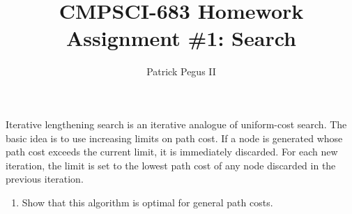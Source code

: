 \documentclass[12pt]{article}
\newenvironment{problem}[2][Problem]{\begin{trivlist}
\item[\hskip \labelsep {\bfseries #1}\hskip \labelsep {\bfseries #2.}]}{\end{trivlist}}
\begin{document}

\title{CMPSCI-683 Homework Assignment \#1: Search}
\author{Patrick Pegus II}
\maketitle

\begin{problem}{1}
	Iterative lengthening search is an iterative analogue of uniform-cost search.
	The basic idea is to use increasing limits on path cost.
	If a node is generated whose path cost exceeds the current limit, it is immediately discarded.
	For each new iteration, the limit is set to the lowest path cost of any node discarded in the previous iteration.
	\begin{enumerate}
		\item Show that this algorithm is optimal for general path costs.


\end{enumerate}
\end{problem}
\end{document}
